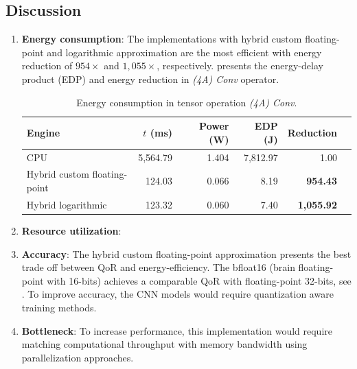 \subsection{Discussion}
\begin{enumerate}

	\item{\textbf{Energy consumption}}: The implementations with hybrid custom floating-point and logarithmic approximation are the most efficient with energy reduction of $954\times$ and $1,055\times$, respectively.  presents the energy-delay product (EDP) and energy reduction in \emph{(4A) Conv} operator.
	
\begin{table}[!htp]\centering
	\caption{Energy consumption in tensor operation \emph{(4A) Conv}.}\label{tab:edp}
	\scriptsize
	\begin{tabular}{lrrrrr}\toprule
		\textbf{Engine} & \textbf{$t$ (ms)} &\textbf{Power (W)} &\textbf{EDP (J)} &\textbf{Reduction} \\\midrule
		CPU &5,564.79 &1.404 &7,812.97 &1.00 \\
		Hybrid custom floating-point &124.03 &0.066 &8.19 &\textbf{954.43} \\
		Hybrid logarithmic &123.32 &0.060 &7.40 &\textbf{1,055.92 }\\
		\bottomrule
	\end{tabular}
\end{table}
	
	\item{\textbf{Resource utilization}}: 
	
	\item{\textbf{Accuracy}}: The hybrid custom floating-point approximation presents the best trade off between QoR and energy-efficiency. The bfloat16 (brain floating-point with 16-bits) achieves a comparable QoR with floating-point 32-bits, see . To improve accuracy, the CNN models would require quantization aware training methods.
	
	\item{\textbf{Bottleneck}}: To increase performance, this implementation would require matching computational throughput with memory bandwidth using parallelization approaches.
\end{enumerate}
